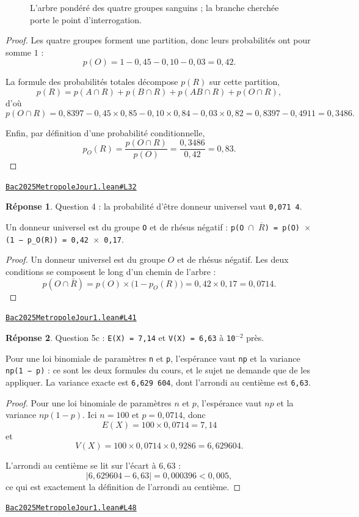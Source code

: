 \documentclass[11pt,a4paper]{article}
\theoremstyle{definition}
\theoremstyle{plain}
\theoremstyle{definition}
\newtheorem*{reponse}{Réponse}
\newcommand{\source}[2]{\par\smallskip\noindent\hfill{\footnotesize\href{#1}{\texttt{#2}}}\par\smallskip}
\begin{document}
\begin{figure}[h]
\centering

\caption{L'arbre pondéré des quatre groupes sanguins ; la branche cherchée porte le point d'interrogation.}
\end{figure}
\begin{proof}
Les quatre groupes forment une partition, donc leurs probabilités ont pour somme $1$ :
\[ p(O) = 1 - 0{,}45 - 0{,}10 - 0{,}03 = 0{,}42 . \]

La formule des probabilités totales décompose $p(R)$ sur cette partition,
\[ p(R) = p(A \cap R) + p(B \cap R) + p(AB \cap R) + p(O \cap R) , \]
d'où
\[ p(O \cap R) = 0{,}8397 - 0{,}45 \times 0{,}85 - 0{,}10 \times 0{,}84
   - 0{,}03 \times 0{,}82 = 0{,}8397 - 0{,}4911 = 0{,}3486 . \]

Enfin, par définition d'une probabilité conditionnelle,
\[ p_O(R) = \frac{p(O \cap R)}{p(O)} = \frac{0{,}3486}{0{,}42} = 0{,}83 . \]
\end{proof}
\source{https://github.com/Commutator-IO/learn-lean/blob/main/exams/2025/Bac2025MetropoleJour1.lean\#L32}{Bac2025MetropoleJour1.lean\#L32}

\begin{reponse}
Question 4 : la probabilité d'être donneur universel vaut \texttt{0,071 4}.

Un donneur universel est du groupe \texttt{O} et de rhésus négatif : \texttt{p(O \(\cap\) \(\overline{R}\)) = p(O) \(\times\)
(1 − p\_O(R)) = 0,42 \(\times\) 0,17}.
\end{reponse}
\begin{proof}
Un donneur universel est du groupe $O$ et de rhésus négatif. Les deux conditions se
composent le long d'un chemin de l'arbre :
\[ p(O \cap \bar{R}) = p(O) \times \bigl(1 - p_O(R)\bigr)
   = 0{,}42 \times 0{,}17 = 0{,}0714 . \]
\end{proof}
\source{https://github.com/Commutator-IO/learn-lean/blob/main/exams/2025/Bac2025MetropoleJour1.lean\#L41}{Bac2025MetropoleJour1.lean\#L41}

\begin{reponse}
Question 5c : \texttt{E(X) = 7,14} et \texttt{V(X) = 6,63} à \texttt{10\(^{-2}\)} près.

Pour une loi binomiale de paramètres \texttt{n} et \texttt{p}, l'espérance vaut \texttt{np} et la variance
\texttt{np(1 − p)} : ce sont les deux formules du cours, et le sujet ne demande que de les
appliquer. La variance exacte est \texttt{6,629 604}, dont l'arrondi au centième est \texttt{6,63}.
\end{reponse}
\begin{proof}
Pour une loi binomiale de paramètres $n$ et $p$, l'espérance vaut $np$ et la variance
$np(1-p)$. Ici $n = 100$ et $p = 0{,}0714$, donc
\[ E(X) = 100 \times 0{,}0714 = 7{,}14 \]
et
\[ V(X) = 100 \times 0{,}0714 \times 0{,}9286 = 6{,}629604 . \]

L'arrondi au centième se lit sur l'écart à $6{,}63$ :
\[ |6{,}629604 - 6{,}63| = 0{,}000396 < 0{,}005 , \]
ce qui est exactement la définition de l'arrondi au centième.
\end{proof}
\source{https://github.com/Commutator-IO/learn-lean/blob/main/exams/2025/Bac2025MetropoleJour1.lean\#L48}{Bac2025MetropoleJour1.lean\#L48}
\end{document}
